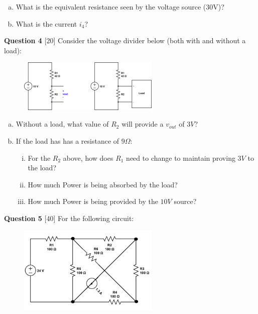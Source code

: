 \documentclass[12pt]{article}
\begin{document}
\begin{enumerate}[(a)]
\item What is the equivalent resistance seen by the voltage source (30V)?
\item What is the current $i_4$?

\end{enumerate}


{\bf Question 4} [20] 
\newline
Consider the voltage divider below (both with and without a load):

\begin{figure}[!h]
  \centering 
  \includegraphics[clip,width=0.6\textwidth]{mid1_3.png}
\end{figure}

\begin{enumerate}[(a)]
\item Without a load, what value of $R_2$ will provide a $v_{out}$ of $3V$?
\item If the load has has a resistance of $9 \Omega$:
\begin{enumerate}[(i)]
\item For the $R_2$ above, how does $R_1$ need to change to maintain proving $3V$ to the load?
\item How much Power is being absorbed by the load?
\item How much Power is being provided by the $10V$ source?
\end{enumerate}
\end{enumerate}
\newpage

{\bf Question 5} [40]
\newline
For the following circuit:

\begin{figure}[h!]
\centering 
\includegraphics[clip,width=0.6\textwidth]{mid1_5.jpg}
\end{figure}
\end{document}
